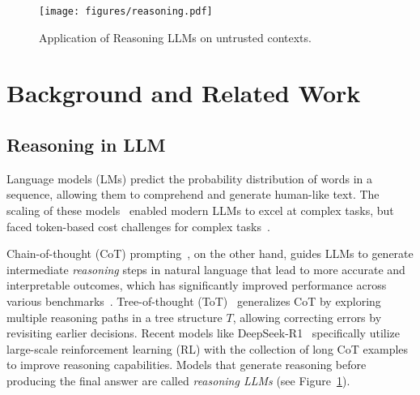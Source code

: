 \begin{figure}[tbp]
    \centering
    \texttt{[image: figures/reasoning.pdf]} %
    \caption{Application of Reasoning LLMs on untrusted contexts.}
    \label{fig:reasoning_llm} %
\end{figure}

\section{Background and Related Work} 

\renewcommand\thefootnote{}%


\subsection{Reasoning in LLM}
Language models (LMs) predict the probability distribution of words in a sequence, allowing them to comprehend and generate human-like text. The scaling of these models~\citep{merity2016pointer, devlin2018bert, brown2020language, mehta2023empirical, zhao2023survey} enabled modern LLMs to excel at complex tasks, but faced token-based cost challenges for complex tasks~\citep{liao2024attention, han2024token,wang-etal-2024-reasoning-token}.

Chain-of-thought (CoT) prompting~\citep{wei2022chain, kojima2022large}, on the other hand, guides LLMs to generate intermediate \emph{reasoning} steps in natural language that lead to more accurate and interpretable outcomes, which has significantly improved performance across various benchmarks~\citep{sun2023survey}. Tree-of-thought (ToT)~\citep{yao2024tree} generalizes CoT by exploring multiple reasoning paths in a tree structure $T$, allowing correcting errors by revisiting earlier decisions. Recent models like DeepSeek-R1~\citep{guo2025deepseek} specifically utilize large-scale reinforcement learning (RL) with the collection of long CoT examples to improve reasoning capabilities. Models that generate reasoning before producing the final answer are  called \textit{reasoning LLMs} (see Figure~\ref{fig:reasoning_llm}). 






















